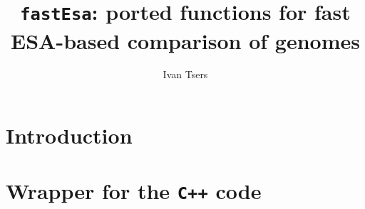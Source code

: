 \documentclass[a4paper]{article}
\begin{document}
\pagestyle{noweb}

\title{\texttt{fastEsa}: ported functions for fast ESA-based comparison of genomes}
\author{Ivan Tsers}
\date{}
\maketitle

\tableofcontents

\section{Introduction}

\newpage
\section{Wrapper for the \texttt{C++} code}

\newpage

\newpage
%


\end{document}
